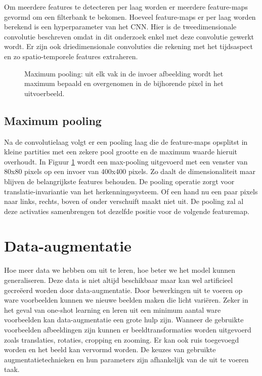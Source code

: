 \npar Om meerdere features te detecteren per laag worden er meerdere feature-maps gevormd om een filterbank te bekomen. Hoeveel feature-maps er per laag worden berekend is een hyperparameter van het CNN. Hier is de tweedimensionale convolutie beschreven omdat in dit onderzoek enkel met deze convolutie gewerkt wordt. Er zijn ook driedimensionale convoluties die rekening met het tijdsaspect en zo spatio-temporele features extraheren.

\begin{figure}[b!]
	\centering
	
	\caption{Maximum pooling: uit elk vak in de invoer afbeelding wordt het maximum bepaald en overgenomen in de bijhorende pixel in het uitvoerbeeld.}
	\label{fig:max-pooling}
\end{figure}
\subsection{Maximum pooling}


Na de convolutielaag volgt er een pooling laag die de feature-maps opsplitst in kleine partities met een zekere pool grootte en de maximum waarde hieruit overhoudt. In Figuur \ref{fig:max-pooling} wordt een max-pooling uitgevoerd met een venster van 80x80 pixels op een invoer van 400x400 pixels. Zo daalt de dimensionaliteit maar blijven de belangrijkste features behouden.
\npar De pooling operatie zorgt voor translatie-invariantie van het herkenningssysteem. Of een hand nu een paar pixels naar links, rechts, boven of onder verschuift maakt niet uit. De pooling zal al deze activaties samenbrengen tot dezelfde positie voor de volgende featuremap. 

\section{Data-augmentatie}\label{sec:data-augm}
Hoe meer data we hebben om uit te leren, hoe beter we het model kunnen generaliseren. Deze data is niet altijd beschikbaar maar kan wel artificieel gecre\"eerd worden door data-augmentatie. Door bewerkingen uit te voeren op ware voorbeelden kunnen we nieuwe beelden maken die licht vari\"eren.
\npar Zeker in het geval van one-shot learning en leren uit een minimum aantal ware voorbeelden kan data-augmentatie een grote hulp zijn. Wanneer de gebruikte voorbeelden afbeeldingen zijn kunnen er beeldtransformaties worden uitgevoerd zoals translaties, rotaties, cropping en zooming. Er kan ook ruis toegevoegd worden en het beeld kan vervormd worden. De keuzes van gebruikte augmentatietechnieken en hun parameters zijn afhankelijk van de uit te voeren taak. 
